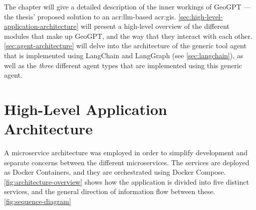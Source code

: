 \begin{comment}
\textit{Phasellus sed ipsum nunc. Nam iaculis felis mauris, sit amet condimentum ex malesuada at. Morbi lacinia odio mi, sit amet pellentesque ante facilisis sit amet. In lobortis elit ut dictum mollis. Aliquam erat volutpat. Morbi sit amet metus nisi. Nulla auctor varius metus at rhoncus. Pellentesque porta mollis leo, eu ultricies nulla mollis ac. Vivamus interdum ac odio vitae sodales. Aenean finibus eros rhoncus molestie elementum. Integer maximus erat vitae purus lobortis iaculis. Etiam blandit varius nulla, sed euismod felis.}

Clearly, a figure showing the architecture is a must, such as Figure~\ref{fig:Architecture}.
Describe all parts of such a figure in reasonable detail in the text, possibly with forward pointers to sections where they will be elaborated on (or backward pointers to sections where tools and methods already have been introduced).
Mention work that motivated your architectural choices, parameter settings, etc.
Those choices should then also be discussed and elaborated on in the Discussion chapter.

\begin{figure}[t!]
    \centering
    \missingfigure{Architecture figure to be added}
    \caption{The missing architecture}
    \label{fig:Architecture}
\end{figure}
\end{comment}

The  chapter will give a detailed description of the inner workings of GeoGPT --- the thesis' proposed solution to an \acrshort{acr:llm}-based \acrshort{acr:gis}. \autoref{sec:high-level-application-architecture} will present a high-level overview of the different modules that make up GeoGPT, and the way that they interact with each other. \autoref{sec:agent-architecture} will delve into the architecture of the generic tool agent that is implemented using LangChain and LangGraph (see \autoref{sec:langchain}), as well as the \textit{three} different agent types that are implemented using this generic agent.

\section{High-Level Application Architecture}
\label{sec:high-level-application-architecture}

A microservice architecture was employed in order to simplify development and separate concerns between the different microservices. The services are deployed as Docker Containers, and they are orchestrated using Docker Compose.  \autoref{fig:architecture-overview} shows how the application is divided into five distinct services, and the general direction of information flow between these. \autoref{fig:sequence-diagram}

